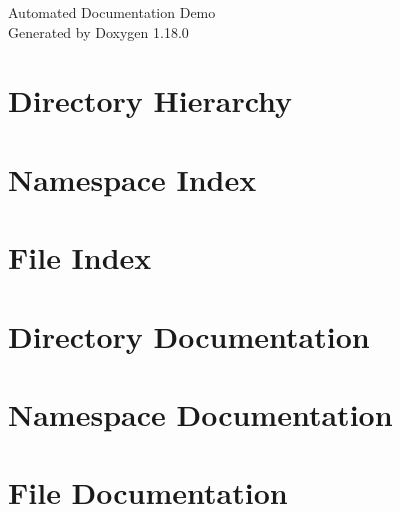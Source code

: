 \documentclass[twoside]{book}
\newcommand{\+}{\discretionary{\mbox{\scriptsize$\hookleftarrow$}}{}{}}
\newcommand{\clearemptydoublepage}{%
    \newpage{\pagestyle{empty}\cleardoublepage}%
  }
\begin{document}
  \raggedbottom
    \hypersetup{pageanchor=false,
                bookmarksnumbered=true,
                pdfencoding=unicode
               }
  \begin{titlepage}
  \vspace*{7cm}
  \begin{center}%
  {\Large Automated Documentation Demo}\\
  \vspace*{1cm}
  {\large Generated by Doxygen 1.18.0}\\
  \end{center}
  \end{titlepage}
  \clearemptydoublepage
  \tableofcontents
  \clearemptydoublepage
  \hypersetup{pageanchor=true}
\chapter{Directory Hierarchy}

\chapter{Namespace Index}

\chapter{File Index}

\chapter{Directory Documentation}

\chapter{Namespace Documentation}


\chapter{File Documentation}


  \backmatter
  \newpage
  \clearemptydoublepage
  \printindex
\end{document}
